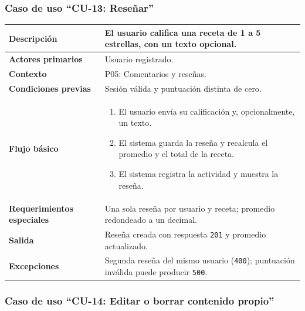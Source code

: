 \documentclass[doc,12pt,a4paper]{apa7}
\begin{document}
\subsubsection{Caso de uso ``CU-13: Reseñar''}

\begin{longtable}{|P{3.3cm}|L{11.2cm}|}
\hline
\textbf{Descripción} & El usuario califica una receta de 1 a 5 estrellas, con un texto opcional. \\ \hline
\textbf{Actores primarios} & Usuario registrado. \\ \hline
\textbf{Contexto} & P05: Comentarios y reseñas. \\ \hline
\textbf{Condiciones previas} & Sesión válida y puntuación distinta de cero. \\ \hline
\textbf{Flujo básico} &
\begin{enumerate}
    \item El usuario envía su calificación y, opcionalmente, un texto.
    \item El sistema guarda la reseña y recalcula el promedio y el total de la receta.
    \item El sistema registra la actividad y muestra la reseña.
\end{enumerate} \\ \hline
\textbf{Requerimientos especiales} & Una sola reseña por usuario y receta; promedio redondeado a un decimal. \\ \hline
\textbf{Salida} & Reseña creada con respuesta \texttt{201} y promedio actualizado. \\ \hline
\textbf{Excepciones} & Segunda reseña del mismo usuario (\texttt{400}); puntuación inválida puede producir \texttt{500}. \\ \hline
\end{longtable}

\subsubsection{Caso de uso ``CU-14: Editar o borrar contenido propio''}
\end{document}
